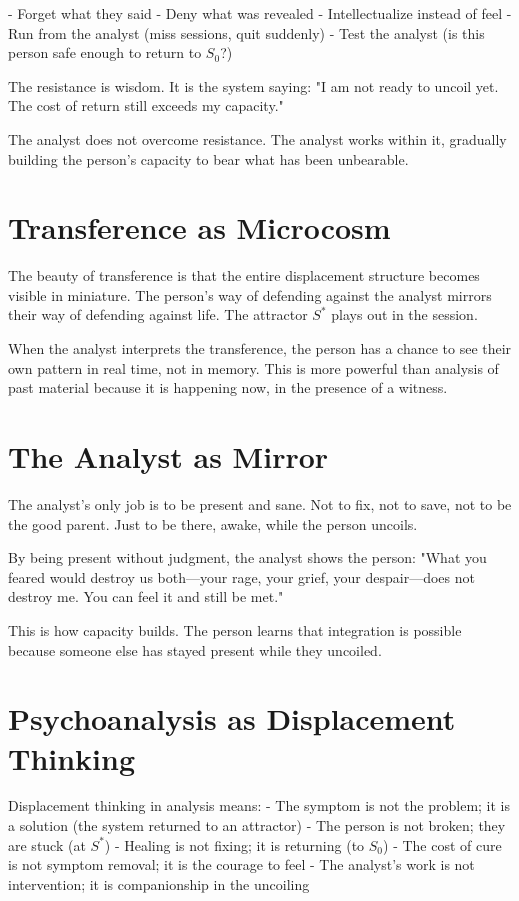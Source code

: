 \documentclass[12pt]{article}
\begin{document}
- Forget what they said
- Deny what was revealed
- Intellectualize instead of feel
- Run from the analyst (miss sessions, quit suddenly)
- Test the analyst (is this person safe enough to return to $S_0$?)

The resistance is wisdom. It is the system saying: "I am not ready to uncoil yet. The cost of return still exceeds my capacity."

The analyst does not overcome resistance. The analyst works within it, gradually building the person's capacity to bear what has been unbearable.

\section{Transference as Microcosm}

The beauty of transference is that the entire displacement structure becomes visible in miniature. The person's way of defending against the analyst mirrors their way of defending against life. The attractor $S^*$ plays out in the session.

When the analyst interprets the transference, the person has a chance to see their own pattern in real time, not in memory. This is more powerful than analysis of past material because it is happening now, in the presence of a witness.

\section{The Analyst as Mirror}

The analyst's only job is to be present and sane. Not to fix, not to save, not to be the good parent. Just to be there, awake, while the person uncoils.

By being present without judgment, the analyst shows the person: "What you feared would destroy us both—your rage, your grief, your despair—does not destroy me. You can feel it and still be met."

This is how capacity builds. The person learns that integration is possible because someone else has stayed present while they uncoiled.

\section{Psychoanalysis as Displacement Thinking}

Displacement thinking in analysis means:
- The symptom is not the problem; it is a solution (the system returned to an attractor)
- The person is not broken; they are stuck (at $S^*$)
- Healing is not fixing; it is returning (to $S_0$)
- The cost of cure is not symptom removal; it is the courage to feel
- The analyst's work is not intervention; it is companionship in the uncoiling
\end{document}
